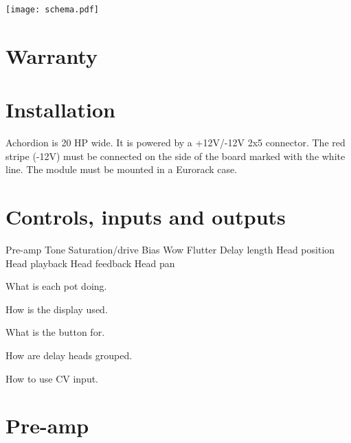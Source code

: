\documentclass[11pt]{article}
\begin{document}
\begin{minipage}{0.6\textwidth}
\vspace{8mm}
\begin{center}
  \texttt{[image: schema.pdf]}
\end{center}
\end{minipage}

\newpage
\color{black}



\begin{minipage}[t]{0.35\textwidth}

\section {Warranty}

\lipsum[1]

\section{Installation}

Achordion is 20 HP wide. It is powered by a +12V/-12V 2x5 connector. The red stripe (-12V) must be connected on the side of the board marked with the white line. The module must be mounted in a Eurorack case.

\end{minipage}%
\begin{minipage}{0.05\textwidth}
\phantom{ }
\end{minipage}%
\begin{minipage}[t]{0.55\textwidth}

\section{Controls, inputs and outputs}

Pre-amp
Tone
Saturation/drive
Bias
Wow
Flutter
Delay length
Head position
Head playback
Head feedback
Head pan

What is each pot doing.

How is the display used.

What is the button for.

How are delay heads grouped.

How to use CV input.

\end{minipage}

\newpage

\section{Pre-amp}
\end{document}
